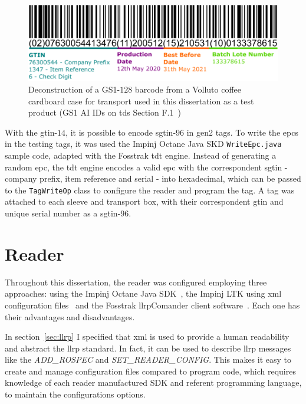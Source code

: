 \begin{figure}
    \centering
    \includegraphics[width=\textwidth]{figs/gs1-128barcode.pdf}
    \caption[Deconstruction of a GS1-$128$ barcode from a Volluto coffee cardboard case for transport used in this dissertation as a test product]{Deconstruction of a GS1-$128$ barcode from a Volluto coffee cardboard case for transport used in this dissertation as a test product (GS1 AI IDs on \acs{tds} Section F.1~\cite{EPCTagData})}
    \label{fig:gs1-128barcode}
\end{figure}

With the \acs{gtin}-$14$, it is possible to encode \ac{sgtin}-$96$ in \ac{gen2} tags. To write the \acp{epc} in the testing tags, it was used the Impinj Octane Java SKD \texttt{WriteEpc.java} sample code, adapted with the Fosstrak \ac{tdt} engine. Instead of generating a random \ac{epc}, the \ac{tdt} engine encodes a valid \ac{epc} with the correspondent \ac{sgtin} - company prefix, item reference and serial - into hexadecimal, which can be passed to the \texttt{TagWriteOp} class to configure the reader and program the tag.
A tag was attached to each sleeve and transport box, with their correspondent \ac{gtin} and unique serial number as a \ac{sgtin}-$96$.

\section{Reader} \label{sec:readerconfiguration}

Throughout this dissertation, the reader was configured employing three approaches: using the Impinj Octane Java SDK~\cite{OctaneSDK}, the Impinj LTK using \ac{xml} configuration files~\cite{LTKXMLJava} and the Fosstrak \ac{llrp}Comander client software~\cite{FosstrakLLRPCommander}.
Each one has their advantages and disadvantages.

In section~\ref{sec:llrp} I specified that \ac{xml} is used to provide a human readability and abstract the \ac{llrp} standard.
In fact, it can be used to describe \ac{llrp} messages like the \textit{ADD\_ROSPEC} and \textit{SET\_READER\_CONFIG}.
This makes it easy to create and manage configuration files compared to program code, which requires knowledge of each reader manufactured SDK and referent programming language, to maintain the configurations options.

